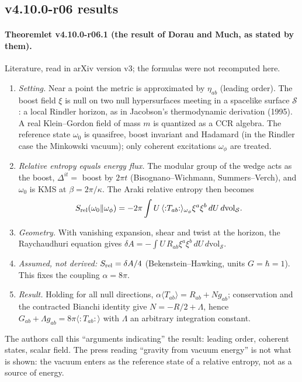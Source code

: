 \subsection*{v4.10.0-r06 results}
\label{subsec:v4100-r06-results}

\paragraph{Theoremlet v4.10.0-r06.1 (the result of Dorau and Much, as stated by them).}
Literature, read in arXiv version v3; the formulas were not recomputed here.
\begin{enumerate}[leftmargin=2em]
\item[(a)] \emph{Setting.} Near a point the metric is approximated by \(\eta_{ab}\) (leading order).  The boost field \(\xi\) is null on two null
hypersurfaces meeting in a spacelike surface \(\mathcal S\): a local Rindler horizon, as in Jacobson's thermodynamic derivation (1995).  A real
Klein--Gordon field of mass \(m\) is quantized as a CCR algebra.  The reference state \(\omega_0\) is quasifree, boost invariant and Hadamard (in the
Rindler case the Minkowski vacuum); only coherent excitations \(\omega_\phi\) are treated.
\item[(b)] \emph{Relative entropy equals energy flux.} The modular group of the wedge acts as the boost, \(\Delta^{it}=\) boost by \(2\pi t\)
(Bisognano--Wichmann, Summers--Verch), and \(\omega_0\) is KMS at \(\beta=2\pi/\kappa\).  The Araki relative entropy then becomes
\[
S_{\rm rel}(\omega_0\Vert\omega_\phi)=-2\pi\int U\,\langle{:}T_{ab}{:}\rangle_{\omega_\phi}\xi^a\xi^b\,dU\,d\mathrm{vol}_{\mathcal S}.
\]
\item[(c)] \emph{Geometry.} With vanishing expansion, shear and twist at the horizon, the Raychaudhuri equation gives
\(\delta A=-\int U\,R_{ab}\xi^a\xi^b\,dU\,d\mathrm{vol}_{\mathcal S}\).
\item[(d)] \emph{Assumed, not derived:} \(S_{\rm rel}=\delta A/4\) (Bekenstein--Hawking, units \(G=\hbar=1\)).  This fixes the coupling \(\alpha=8\pi\).
\item[(e)] \emph{Result.} Holding for all null directions, \(\alpha\langle T_{ab}\rangle=R_{ab}+Ng_{ab}\); conservation and the contracted Bianchi identity
give \(N=-R/2+\Lambda\), hence \(G_{ab}+\Lambda g_{ab}=8\pi\langle{:}T_{ab}{:}\rangle\) with \(\Lambda\) an arbitrary integration constant.
\end{enumerate}
The authors call this ``arguments indicating'' the result: leading order, coherent states, scalar field.  The press reading ``gravity from vacuum
energy'' is not what is shown: the vacuum enters as the reference state of a relative entropy, not as a source of energy.

